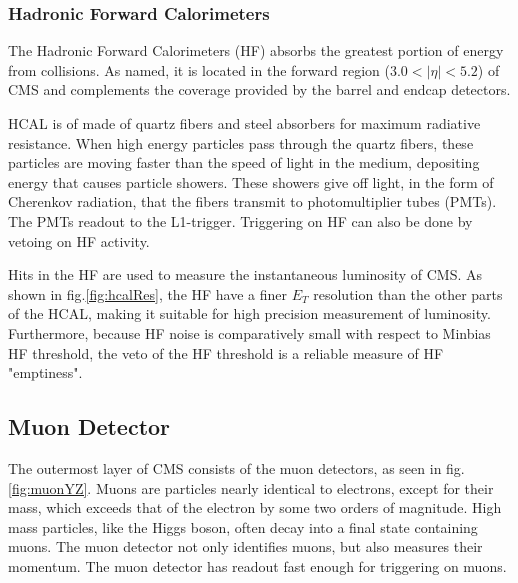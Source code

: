 \subsubsection{Hadronic Forward Calorimeters}

The Hadronic Forward Calorimeters (HF) absorbs the greatest portion of energy from collisions. As named, it is located in the forward region ($3.0<|\eta| < 5.2 $) of CMS and complements the coverage provided by the barrel and endcap detectors.

HCAL is of made of quartz fibers and steel absorbers for maximum radiative resistance. When high energy particles pass through the quartz fibers, these particles are moving faster than the speed of light in the medium, depositing energy that causes particle showers. These showers give off light, in the form of Cherenkov radiation, that the fibers transmit to photomultiplier tubes (PMTs). The PMTs readout to the L1-trigger. Triggering on HF can also be done by vetoing on HF activity.

Hits in the HF are used to measure the instantaneous luminosity of CMS. As shown in fig.\ref{fig:hcalRes}, the HF have a finer $E_T$ resolution than the other parts of the HCAL, making it suitable for high precision measurement of luminosity. Furthermore, because HF noise is comparatively small with respect to Minbias HF threshold, the veto of the HF threshold is a reliable measure of HF "emptiness". 

\subsection{Muon Detector}

The outermost layer of CMS consists of the muon detectors, as seen in fig.\ref{fig:muonYZ}. Muons are particles nearly identical to electrons, except for their mass, which exceeds that of the electron by some two orders of magnitude. High mass particles, like the Higgs boson, often decay into a final state containing muons. The muon detector not only identifies muons, but also measures their momentum. The muon detector has readout fast enough for triggering on muons.

